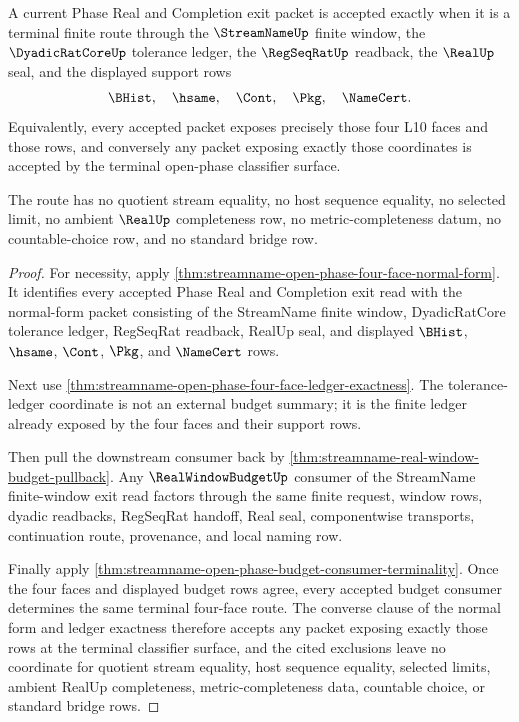 \begin{theorem}
\label{thm:streamname-open-phase-exit-route-completeness}
A current Phase Real and Completion exit packet is accepted exactly when it is a terminal finite route through the $\StreamNameUp$ finite window, the $\DyadicRatCoreUp$ tolerance ledger, the $\RegSeqRatUp$ readback, the $\RealUp$ seal, and the displayed support rows
$$
\BHist,\quad \hsame,\quad \Cont,\quad \Pkg,\quad \NameCert.
$$
Equivalently, every accepted packet exposes precisely those four L10 faces and those rows, and conversely any packet exposing exactly those coordinates is accepted by the terminal open-phase classifier surface.

The route has no quotient stream equality, no host sequence equality, no selected limit, no ambient $\RealUp$ completeness row, no metric-completeness datum, no countable-choice row, and no standard bridge row.
\end{theorem}
\begin{proof}
For necessity, apply \autoref{thm:streamname-open-phase-four-face-normal-form}. It identifies every accepted Phase Real and Completion exit read with the normal-form packet consisting of the StreamName finite window, DyadicRatCore tolerance ledger, RegSeqRat readback, RealUp seal, and displayed $\BHist$, $\hsame$, $\Cont$, $\Pkg$, and $\NameCert$ rows.

Next use \autoref{thm:streamname-open-phase-four-face-ledger-exactness}. The tolerance-ledger coordinate is not an external budget summary; it is the finite ledger already exposed by the four faces and their support rows.

Then pull the downstream consumer back by \autoref{thm:streamname-real-window-budget-pullback}. Any $\RealWindowBudgetUp$ consumer of the StreamName finite-window exit read factors through the same finite request, window rows, dyadic readbacks, RegSeqRat handoff, Real seal, componentwise transports, continuation route, provenance, and local naming row.

Finally apply \autoref{thm:streamname-open-phase-budget-consumer-terminality}. Once the four faces and displayed budget rows agree, every accepted budget consumer determines the same terminal four-face route. The converse clause of the normal form and ledger exactness therefore accepts any packet exposing exactly those rows at the terminal classifier surface, and the cited exclusions leave no coordinate for quotient stream equality, host sequence equality, selected limits, ambient RealUp completeness, metric-completeness data, countable choice, or standard bridge rows.
\end{proof}

